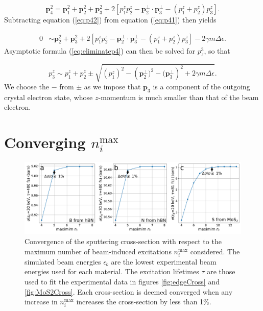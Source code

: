 \documentclass{article}
\begin{document}
\begin{equation}
  \mathbf{p}_4^2
  =
  \mathbf{p}_1^2 + \mathbf{p}_2^2 + \mathbf{p}_3^2
  + 2\left[
  p^z_1p^z_2 - \mathbf{p}^{\perp}_2 \cdot \mathbf{p}^{\perp}_3 
    - (p^z_1 + p^z_2)p^z_3
  \right].
  \label{eq:p42}
\end{equation}
%
Subtracting equation (\ref{eq:p42}) from equation (\ref{eq:p41}) then yields

\begin{equation}
\label{eq:eliminatep4}
\begin{aligned}
    0
    &\sim
    \mathbf{p}_2^2 + \mathbf{p}_3^2
    +
    2\left[
    p^z_1p^z_2 - \mathbf{p}^{\perp}_2 \cdot \mathbf{p}^{\perp}_3 - (p^z_1 + p^z_2)p^z_3
    \right]
    -
    2\gamma m\Delta\epsilon.
\end{aligned}
\end{equation}
%
Asymptotic formula (\ref{eq:eliminatep4}) can then be solved for $p^3_z$, so that

\begin{equation}
\label{eq:p3z}
    p_3^z
    \sim
    p_1^z + p_2^z
    \pm
    \sqrt{
    \left(p_1^z\right)^2
    -
    \left(\mathbf{p}_2^\perp)^2 - (\mathbf{p}_3^\perp\right)^2
    +
    2\gamma m\Delta\epsilon
    }.
\end{equation}
%
We choose the $-$ from $\pm$ as we impose that $\mathbf{p}_3$ is a
component of the outgoing crystal electron state, whose $z$-momentum is much
smaller than that of the beam electron.

\pagebreak
\section{Converging $n_i^\text{max}$}
\label{app:nimax}

\begin{figure}[H]
  \centering
  \includegraphics[width=\textwidth]{images/nimax.pdf}
  \caption{
    Convergence of the sputtering cross-section with respect to the maximum
    number of beam-induced excitations $n_i^\text{max}$ considered.
    The simulated beam energies $\epsilon_b$ are the lowest experimental beam
    energies used for each material.
    The excitation lifetimes $\tau$ are those used to fit the experimental data
    in figures \ref{fig:edgeCross} and \ref{fig:MoS2Cross}.
    Each cross-section is deemed converged when any increase in $n_i^\text{max}$
    increases the cross-section by less than 1\%.
  }
  \label{fig:nimax}
\end{figure}
\end{document}
